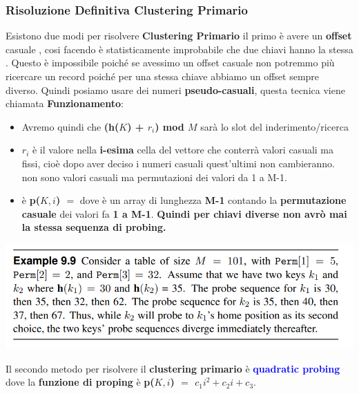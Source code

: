 \subsubsection{Risoluzione Definitiva Clustering Primario}
Esistono due modi per risolvere \textbf{Clustering Primario} il primo  è avere un \textbf{offset} casuale , cosi facendo è statisticamente improbabile che due chiavi hanno la stessa \textbf{\textcolor{blue}{}}. Questo è impossibile poiché  se avessimo un offset casuale non potremmo più ricercare un record poiché per una stessa chiave abbiamo un offset sempre diverso. Quindi posiamo usare dei numeri \textbf{pseudo-casuali}, questa tecnica viene chiamata \textbf{\textcolor{blue}{}}\newline\newline
\textbf{Funzionamento}:
\begin{itemize}
    \item Avremo quindi che \textbf{(h($K$) + $r_i$) mod $M$} sarà lo slot del inderimento/ricerca
    \item $r_i$ è il valore nella \textbf{i-esima} cella del vettore che conterrà valori casuali ma fissi, cioè dopo aver deciso i numeri casuali quest'ultimi non cambieranno. non sono valori casuali ma permutazioni dei valori da 1 a M-1.
    \item \textbf{\textcolor{blue}{}} è \textbf{p($K,i$) $=$ } dove \textbf{} è un array di lunghezza \textbf{M-1} contando la \textbf{permutazione casuale} dei valori fa \textbf{ 1 a M-1}.
    \textbf{Quindi per chiavi diverse non avrò mai la stessa sequenza di probing.}
\end{itemize}
\begin{center}
    \includegraphics[scale = 0.6]{Capitoli/HashTable/Esempi/EsempioPseudo.png}
\end{center}
Il secondo metodo per risolvere il \textbf{clustering primario} è \textbf{\textcolor{blue}{quadratic probing}} dove la \textbf{funzione di proping} è \textbf{p($K,i$) $=$ $c_1 i^2 + c_2i + c_3$}. \newline
